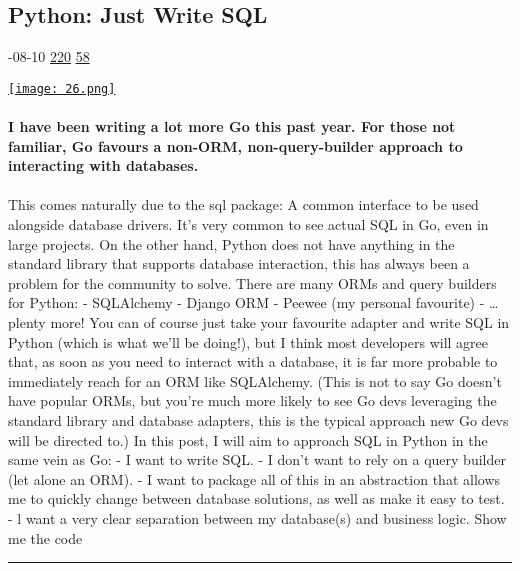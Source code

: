 \documentclass[10pt,a4paper]{article}
\begin{document}
\begin{multicols*}{2}
\begin{minipage}{\linewidth}
\subsection{Python: Just Write SQL}
\textsc{\footnotesize
{\scriptsize\faCalendar}-08-10 
{\scriptsize\faThumbsOUp}\space 
\href{http://news.ycombinator.com/item?id=37118633\&utm\_term=comment}{220} 
{\scriptsize\faComments}\space 
\href{http://news.ycombinator.com/item?id=37118633\&utm\_term=comment}{58} 
}
\par\medskip\noindent
\href{https://joaodlf.com/python-just-write-sql?utm\_source=hackernewsletter\&utm\_medium=email\&utm\_term=code}{
    \texttt{[image: 26.png]}
}
\end{minipage}
\paragraph{}
\textbf{I have been writing a lot more Go this past year. For those not familiar, Go favours a non-ORM, non-query-builder approach to interacting with databases.}
\paragraph{}
 This comes naturally due to the sql package: A common interface to be used alongside database drivers. It’s very common to see actual SQL in Go, even in large projects. On the other hand, Python does not have anything in the standard library that supports database interaction, this has always been a problem for the community to solve. There are many ORMs and query builders for Python:
- SQLAlchemy
- Django ORM
- Peewee (my personal favourite)
- … plenty more!
You can of course just take your favourite adapter and write SQL in Python (which is what we’ll be doing!), but I think most developers will agree that, as soon as you need to interact with a database, it is far more probable to immediately reach for an ORM like SQLAlchemy.
(This is not to say Go doesn’t have popular ORMs, but you’re much more likely to see Go devs leveraging the standard library and database adapters, this is the typical approach new Go devs will be directed to.)
In this post, I will aim to approach SQL in Python in the same vein as Go:
- I want to write SQL.
- I don’t want to rely on a query builder (let alone an ORM).
- I want to package all of this in an abstraction that allows me to quickly change between database solutions, as well as make it easy to test.
- l want a very clear separation between my database(s) and business logic.
Show me the code
\par\noindent\textcolor{red}{\rule{\linewidth}{0.2mm}}
\vfill
\null
\noindent\begin{minipage}{\linewidth}

\end{minipage}
\end{multicols*}
\end{document}
